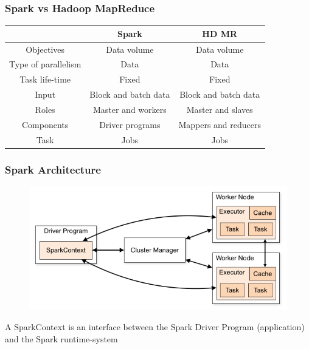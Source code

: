 \documentclass{beamer}
\begin{document}
\begin{frame}
\frametitle{Spark vs Hadoop MapReduce}

\begin{tabular}{|c|c|c|} \hline
 & Spark & HD MR \\ \hline \hline 
Objectives & Data volume & Data volume \\ \hline 
Type of parallelism & Data & Data \\ \hline 
Task life-time  & Fixed & Fixed \\  \hline 
Input  & Block and batch data  & Block and batch data \\ \hline 
Roles & Master and workers & Master and slaves \\  \hline 
Components & Driver programs & Mappers and reducers \\ \hline 
Task  & Jobs & Jobs \\ \hline
\end{tabular}
\end{frame}
\begin{frame}[fragile]
\frametitle{Spark Architecture}

\begin{figure}[!htb]
\centering
\includegraphics[scale=0.5]{pic/spark.png}
\end{figure}

A SparkContext is an interface between the Spark Driver Program
  (application) and the Spark runtime-system

\end{frame}
\end{document}
